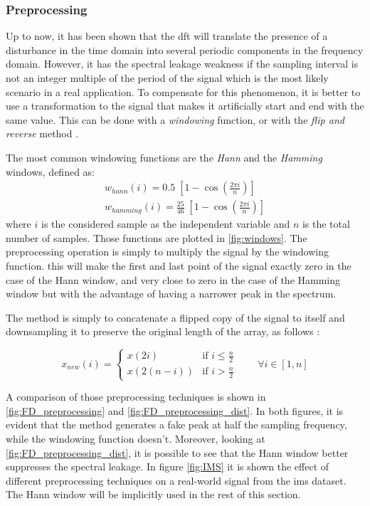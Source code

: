 \subsubsection{Preprocessing}
Up to now, it has been shown that the \gls{dft} will translate the presence of a disturbance in the time domain into several periodic components in the frequency domain. However, it has the spectral leakage weakness if the sampling interval is not an integer multiple of the period of the signal which is the most likely scenario in a real application. To compensate for this phenomenon, it is better to use a transformation to the signal that makes it artificially start and end with the same value. This can be done with a \emph{windowing} function, or with the \emph{flip and reverse} method \cite{Preprocessing}. 

The most common windowing functions are the \emph{Hann} and the \emph{Hamming} windows, defined as:
\begin{eqnarray}
    w_{hann}(i) = 0.5\; \left[1 - \cos \left ( \frac{2 \pi i}{n} \right) \right] \\
    w_{hamming}(i) = \frac{25}{46}\; \left[1 - \cos \left ( \frac{2 \pi i}{n} \right) \right]
\end{eqnarray}
where $i$ is the considered sample as the independent variable and $n$ is the total number of samples. Those functions are plotted in \autoref{fig:windows}. The preprocessing operation is simply to multiply the signal by the windowing function. this will make the first and last point of the signal exactly zero in the case of the Hann window, and very close to zero in the case of the Hamming window but with the advantage of having a narrower peak in the spectrum. 

The  method is simply to concatenate a flipped copy of the signal to itself and downsampling it to preserve the original length of the array, as follows \cite{Preprocessing}:

\begin{equation}
    x_{new}(i) = \begin{cases}
        x(2i) & \text{if } i \leq \frac{n}{2} \\
        x(2(n-i)) & \text{if } i > \frac{n}{2}
    \end{cases} \qquad \forall i \in [1,n]
\end{equation}

A comparison of those preprocessing techniques is shown in \autoref{fig:FD_preprocessing} and \autoref{fig:FD_preprocessing_dist}. In both figures, it is evident that the  method generates a fake peak at half the sampling frequency, while the windowing function doesn't. Moreover, looking at \autoref{fig:FD_preprocessing_dist}, it is possible to see that the Hann window better suppresses the spectral leakage.
In figure \autoref{fig:IMS} it is shown the effect of different preprocessing techniques on a real-world signal from the \gls{ims} dataset. The Hann window will be implicitly used in the rest of this section.



